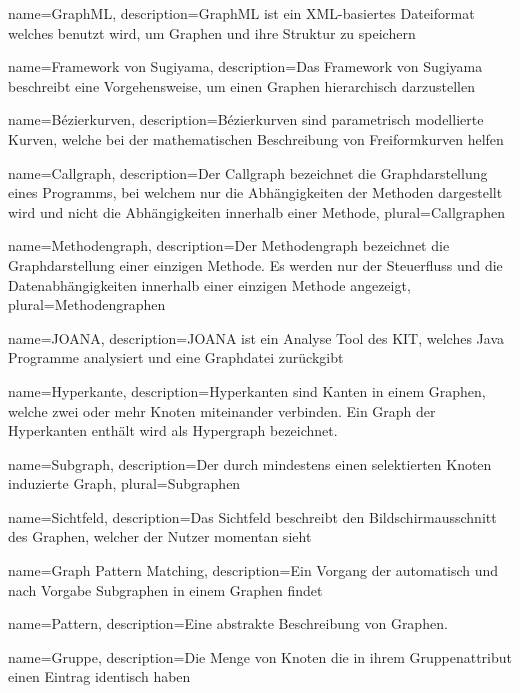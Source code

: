 {
  name=GraphML,
  description={GraphML ist ein XML-basiertes Dateiformat welches benutzt wird, um Graphen und ihre Struktur zu speichern}
}

{
  name=Framework von Sugiyama,
  description={Das Framework von Sugiyama beschreibt eine Vorgehensweise, um einen Graphen hierarchisch darzustellen}
}

{
  name=Bézierkurven,
  description={Bézierkurven sind parametrisch modellierte Kurven, welche bei der mathematischen Beschreibung von Freiformkurven helfen}
}

{
  name=Callgraph,
  description={Der Callgraph bezeichnet die Graphdarstellung eines Programms, bei welchem nur die Abhängigkeiten der Methoden dargestellt wird und nicht die Abhängigkeiten innerhalb einer Methode},
  plural=Callgraphen
}

{
  name=Methodengraph,
  description={Der Methodengraph bezeichnet die Graphdarstellung einer einzigen Methode. Es werden nur der Steuerfluss und die Datenabhängigkeiten innerhalb einer einzigen Methode angezeigt},
  plural=Methodengraphen
}

{
  name=JOANA,
  description={JOANA ist ein Analyse Tool des KIT, welches Java Programme analysiert und eine Graphdatei zurückgibt}
}

{
  name=Hyperkante,
  description={Hyperkanten sind Kanten in einem Graphen, welche zwei oder mehr Knoten miteinander verbinden. Ein Graph der Hyperkanten enthält wird als Hypergraph bezeichnet.}
}

{
  name=Subgraph,
  description={Der durch mindestens einen selektierten Knoten induzierte Graph},
  plural=Subgraphen
}

{
	name=Sichtfeld,
	description={Das Sichtfeld beschreibt den Bildschirmausschnitt des Graphen, welcher der Nutzer momentan sieht}
}

{
  name=Graph Pattern Matching,
  description={Ein Vorgang der automatisch und nach Vorgabe Subgraphen in einem Graphen findet}
}

{
  name=Pattern,
  description={Eine abstrakte Beschreibung von Graphen.}
}

{
  name=Gruppe,
  description={Die Menge von Knoten die in ihrem Gruppenattribut einen Eintrag identisch haben}
}



